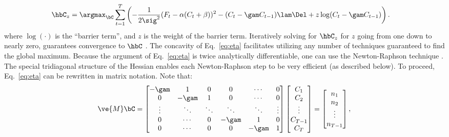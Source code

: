 \begin{align} \label{eq:eta}
\hbC_{\zzz} &= \argmax_{\bC}  \sum_{t=1}^T \left( -\frac{1}{2 \sig^2}(F_t - \alpha(C_t + \beta))^2  -  (C_t-\gam C_{t-1})  \lam \Del + \zzz \log (C_t-\gam C_{t-1}) \right).
\end{align}
\noindent where $\log (\cdot)$ is the ``barrier term'', and $z$ is the weight of the barrier term.  Iteratively solving for $\hbC_{\zzz}$ for $z$ going from one down to nearly zero, guarantees convergence to $\hbC$ \cite{CONV04}. %
The concavity of Eq.~\eqref{eq:eta} facilitates utilizing any number of techniques guaranteed to find the global maximum.  Because the argument of Eq.~\eqref{eq:eta} is twice analytically differentiable, one can use the Newton-Raphson technique \cite{Press92}. The special tridiagonal structure of the Hessian enables each Newton-Raphson step to be very efficient (as described below).  To proceed, Eq.~\eqref{eq:eta} can be rewritten in matrix notation.  Note that:
\begin{align} \label{eq:M}
\ve{M} \bC = %
\begin{bmatrix}
-\gam & 1 & 0 & 0 & \cdots & 0 \\
0 & -\gam & 1 & 0 & \cdots  & 0 \\
\vdots & \ddots & \ddots & \ddots & \ddots & \vdots  \\
0 & \cdots & 0  & -\gam & 1 & 0 \\
0 & \cdots & 0 & 0 & -\gam & 1
\end{bmatrix}
\begin{bmatrix}
C_1 \\ C_2 \\  \vdots \\ C_{T-1} \\ C_T
\end{bmatrix}
= 
\begin{bmatrix}
n_1 \\ n_2 \\ \vdots  \\ n_{T-1}
\end{bmatrix}
, %
\end{align}
